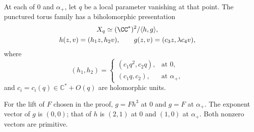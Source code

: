\begin{lemma}\label{fill:tate}
At each of $0$ and $\alpha_+$, let $q$ be a local parameter vanishing
at that point. The punctured torus family has a biholomorphic presentation
\begin{equation}
 \begin{gathered}
 X_q\simeq(\CC^*)^2/\langle h,g\rangle,\\
 h(z,v)=(h_1z,h_2v),\qquad g(z,v)=(c_3z,\lambda c_4v),
 \end{gathered}
 \label{fill:tate-period}
\end{equation}
where
\[
 (h_1,h_2)=
 \begin{cases}
 (c_1q^2,c_2q),&\text{at }0,\\
 (c_1q,c_2),&\text{at }\alpha_+,
 \end{cases}
\]
and $c_i=c_i(q)\in\mathbb{C}^*+O(q)$ are holomorphic units.

For the lift of $F$ chosen in the proof, $g=Fh^3$ at $0$ and
$g=F$ at $\alpha_+$. The exponent vector of $g$ is $(0,0)$;
that of $h$ is $(2,1)$ at $0$ and $(1,0)$ at $\alpha_+$.
Both nonzero vectors are primitive.
\end{lemma}
